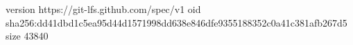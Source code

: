 version https://git-lfs.github.com/spec/v1
oid sha256:dd41dbd1c5ea95d44d1571998dd638e846dfe9355188352c0a41c381afb267d5
size 43840
